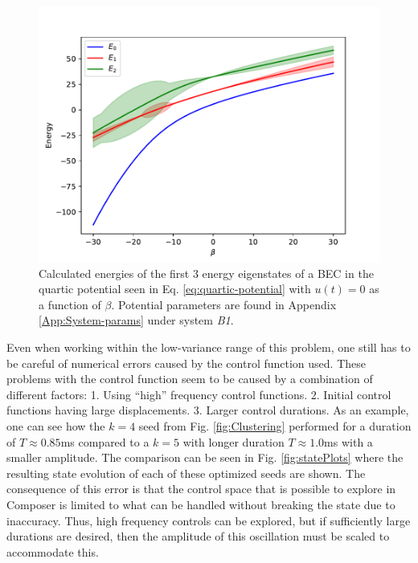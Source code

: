 \documentclass[a4paper, twocolumn]{revtex4-1}
\begin{document}
\begin{figure}
	\includegraphics[width=\columnwidth]{graphics/stateAnalysis/Energylevels.pdf}
	\caption{Calculated energies of the first 3 energy eigenstates of a BEC in the quartic potential seen in Eq. \eqref{eq:quartic-potential} with $u(t)=0$ as a function of $\beta$. Potential parameters are found in Appendix \ref{App:System-params} under system \textit{B1}.}
	\label{fig:energyLevels}
\end{figure}

Even when working within the low-variance range of this problem, one still has to be careful of numerical errors caused by the control function used. These problems with the control function seem to be caused by a combination of different factors:
1. Using ``high'' frequency control functions. 2. Initial control functions having large displacements. 3. Larger control durations. As an example, one can see how the $k=4$ seed from Fig. \ref{fig:Clustering} performed for a duration of $T\approx 0.85$ms compared to a $k=5$ with longer duration  $T\approx 1.0$ms with a smaller amplitude. The comparison can be seen in Fig. \ref{fig:statePlots} where the resulting state evolution of each of these optimized seeds are shown. The consequence of this error is that the control space that is possible to explore in Composer is limited to what can be handled without breaking the state due to inaccuracy. Thus, high frequency controls can be explored, but if sufficiently large durations are desired, then the amplitude of this oscillation must be scaled to accommodate this.
\end{document}
